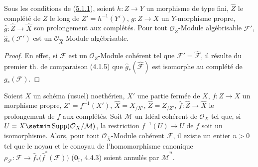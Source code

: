 \begin{lemma}[5.3.3]
\label{III.5.3.3-fr}
Sous les conditions de \textup{(\hyperref[III.5.1.1-fr]{5.1.1})}, soient $h:Z\to Y$ un
morphisme de type fini, $\widehat Z$ le complété de $Z$ le long de
$Z'=h^{-1}(Y')$, $g:Z\to X$ un $Y$-morphisme propre,
$\widehat g:\widehat Z\to\widehat X$ son prolongement aux complétés. Pour tout
$\mathcal O_{\widehat Z}$-Module algébrisable $\mathcal F'$,
$\widehat g_*(\mathcal F')$ est un $\mathcal O_{\widehat X}$-Module algébrisable.
\end{lemma}

\begin{proof}
En effet, si $\mathcal F$ est un $\mathcal O_Z$-Module cohérent tel que
$\mathcal F'=\widehat{\mathcal F}$, il résulte du premier th. de comparaison
(4.1.5) que $\widehat g_*(\widehat{\mathcal F})$ est isomorphe au complété de
$g_*(\mathcal F)$.
\end{proof}

\begin{lemma}[5.3.4]
\label{III.5.3.4-fr}
Soient $X$ un schéma (usuel) noethérien, $X'$ une partie fermée de $X$,
$f:Z\to X$ un morphisme propre, $Z'=f^{-1}(X')$,
$\widehat X=X_{/X'}$, $\widehat Z=Z_{/Z'}$,
$\widehat f:\widehat Z\to\widehat X$ le prolongement de $f$ aux complétés. Soit
$\mathcal M$ un Idéal cohérent de $\mathcal O_X$ tel que, si
$U=X\setmin\operatorname{Supp}(\mathcal O_X/\mathcal M)$, la restriction
$f^{-1}(U)\to U$ de $f$ soit un isomorphisme. Alors, pour tout
$\mathcal O_{\widehat X}$-Module cohérent $\mathcal F$, il existe un entier $n>0$
tel que le noyau et le conoyau de l'homomorphisme canonique
$\rho_{\mathcal F}:\mathcal F\longrightarrow
\widehat f_*\bigl(\widehat f^{*}(\mathcal F)\bigr)$
\textup{($\mathbf{0}_{\mathrm I}$, 4.4.3)} soient annulés par $\widehat{\mathcal M}^{n}$.
\end{lemma}

